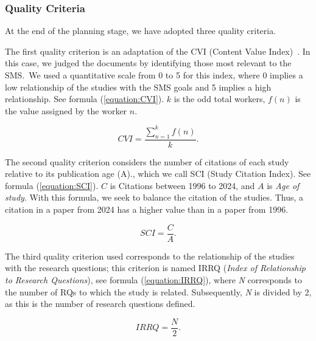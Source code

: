 
\subsubsection{Quality Criteria}
At the end of the planning stage, we have adopted three quality criteria.

The first quality criterion is an adaptation of the CVI (Content Value Index)~\cite{Almanasreh2019214, yaghmaei2003content}. In this case, we judged the documents by identifying those most relevant to the SMS.~We used a quantitative scale from 0 to 5 for this index, where 0 implies a low relationship of the studies with the SMS goals and 5 implies a high relationship. See formula (\ref{equation:CVI}). $k$ is the odd total workers, $f(n)$ is the value assigned by the worker $n$.

\begin{equation}
	\label{equation:CVI}
	CVI = \frac{\sum_{n=1}^{k} f(n)}{k}.
\end{equation}

The second quality criterion considers the number of citations of each study relative to its publication age (A)., which we call SCI (Study Citation Index). See  formula (\ref{equation:SCI}). $C$ is Citations between 1996 to 2024, and $A$ is \textit{Age of study}. With this formula, we seek to balance the citation of the studies. Thus, a citation in a  paper from 2024 has a higher value than in a paper from 1996.


\begin{equation}
	\label{equation:SCI}
	SCI = \frac{C}{A}.
\end{equation}


\hbox{}
The third quality criterion used corresponds to the relationship of the studies with the research questions; this criterion is named IRRQ (\textit{Index of Relationship to Research Questions}), see formula (\ref{equation:IRRQ}), where \textit{N} corresponds to the number of RQs to which the study is related. Subsequently, \textit{N} is divided by 2, as this is the number of research questions defined.

\begin{equation}
	\label{equation:IRRQ}
	IRRQ = \frac{N}{2}.
\end{equation}

